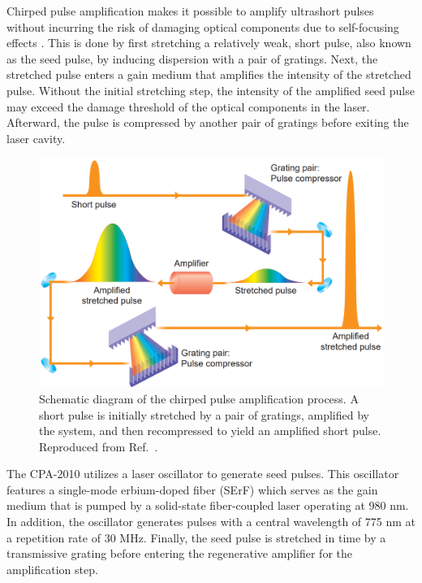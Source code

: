 Chirped pulse amplification makes it possible to amplify ultrashort pulses without incurring the risk of damaging optical components due to self-focusing effects \cite{strickland1985compression}. This is done by first stretching a relatively weak, short pulse, also known as the seed pulse, by inducing dispersion with a pair of gratings. Next, the stretched pulse enters a gain medium that amplifies the intensity of the stretched pulse. Without the initial stretching step, the intensity of the amplified seed pulse may exceed the damage threshold of the optical components in the laser. Afterward, the pulse is compressed by another pair of gratings before exiting the laser cavity. 

\begin{figure}
	\centering
	\includegraphics[scale=0.35]{images/chapter_methods/cpa_process_service}
	\caption{Schematic diagram of the chirped pulse amplification process. A short pulse is initially stretched by a pair of gratings, amplified by the system, and then recompressed to yield an amplified short pulse. Reproduced from Ref.\ \cite{service154}.}
	\label{fig:cpa_process}
\end{figure}

The CPA-2010 utilizes a laser oscillator to generate seed pulses. This oscillator features a single-mode erbium-doped fiber (SErF) which serves as the gain medium that is pumped by a solid-state fiber-coupled laser operating at 980 nm. In addition, the oscillator generates pulses with a central wavelength of 775 nm at a repetition rate of 30 MHz. Finally, the seed pulse is stretched in time by a transmissive grating before entering the regenerative amplifier for the amplification step. 

